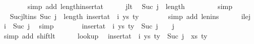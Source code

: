\begin{isabellebody}
\ \ \ \ \ \ \isamarkupfalse%
\ {\isacharparenleft}{\kern0pt}simp\ add{\isacharcolon}{\kern0pt}\ length{\isacharunderscore}{\kern0pt}insert{\isacharunderscore}{\kern0pt}at{\isacharparenright}{\kern0pt}\isanewline
\isanewline
\ \ \ \ \isamarkupfalse%
\ j{\isacharunderscore}{\kern0pt}lt\ \isamarkupfalse%
\ {\isachardoublequoteopen}Suc\ j\ {\isasymle}\ length\ {\isasymGamma}{\isachardoublequoteclose}\isanewline
\ \ \ \ \ \ \isamarkupfalse%
\ simp\isanewline
\ \ \ \ \isamarkupfalse%
\ \isamarkupfalse%
\ Sucj{\isacharunderscore}{\kern0pt}lt{\isacharunderscore}{\kern0pt}ins{\isacharcolon}{\kern0pt}\ {\isachardoublequoteopen}Suc\ j\ {\isacharless}{\kern0pt}\ length\ {\isacharparenleft}{\kern0pt}insert{\isacharunderscore}{\kern0pt}at\ {\isasymGamma}\ i\ {\isacharparenleft}{\kern0pt}ys{\isacharcomma}{\kern0pt}\ ty{}{\isacharparenright}{\kern0pt}{\isacharparenright}{\kern0pt}{\isachardoublequoteclose}\isanewline
\ \ \ \ \ \ \isamarkupfalse%
\ {\isacharparenleft}{\kern0pt}simp\ add{\isacharcolon}{\kern0pt}\ len{\isacharunderscore}{\kern0pt}ins{\isacharparenright}{\kern0pt}\isanewline
\isanewline
\ \ \ \ \isamarkupfalse%
\ i{\isacharunderscore}{\kern0pt}le{\isacharunderscore}{\kern0pt}j\ \isamarkupfalse%
\ {\isachardoublequoteopen}i\ {\isacharless}{\kern0pt}\ Suc\ j{\isachardoublequoteclose}\ \isamarkupfalse%
\ simp\isanewline
\ \ \ \ \isamarkupfalse%
\ \isamarkupfalse%
\ {\isachardoublequoteopen}{\isacharparenleft}{\kern0pt}insert{\isacharunderscore}{\kern0pt}at\ {\isasymGamma}\ i\ {\isacharparenleft}{\kern0pt}ys{\isacharcomma}{\kern0pt}\ ty{}{\isacharparenright}{\kern0pt}{\isacharparenright}{\kern0pt}\ {\isacharbang}{\kern0pt}\ Suc\ j\ {\isacharequal}{\kern0pt}\ {\isasymGamma}\ {\isacharbang}{\kern0pt}\ j{\isachardoublequoteclose}\isanewline
\ \ \ \ \ \ \isamarkupfalse%
\ {\isacharparenleft}{\kern0pt}simp\ add{\isacharcolon}{\kern0pt}\ shift{\isacharunderscore}{\kern0pt}lt{\isacharparenright}{\kern0pt}\isanewline
\isanewline
\ \ \ \ \isamarkupfalse%
\ lookup\ \isamarkupfalse%
\ {\isachardoublequoteopen}{\isacharparenleft}{\kern0pt}insert{\isacharunderscore}{\kern0pt}at\ {\isasymGamma}\ i\ {\isacharparenleft}{\kern0pt}ys{\isacharcomma}{\kern0pt}\ ty{}{\isacharparenright}{\kern0pt}{\isacharparenright}{\kern0pt}\ {\isacharbang}{\kern0pt}\ Suc\ j\ {\isacharequal}{\kern0pt}\ {\isacharparenleft}{\kern0pt}xs{\isacharcomma}{\kern0pt}\ ty{\isacharparenright}{\kern0pt}{\isachardoublequoteclose}\isanewline

\end{isabellebody}
